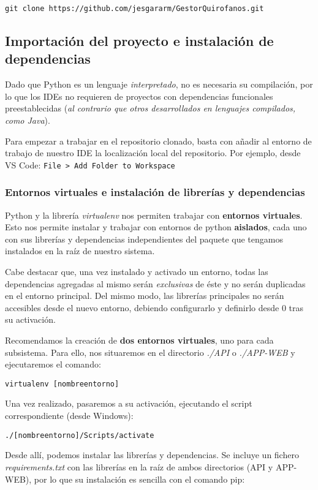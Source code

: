 \texttt{git clone https://github.com/jesgararm/GestorQuirofanos.git}

\subsection{Importación del proyecto e instalación de dependencias}

Dado que Python es un lenguaje \textit{interpretado}, no es necesaria su compilación, por lo que los IDEs no requieren de proyectos con dependencias funcionales preestablecidas (\textit{al contrario que otros desarrollados en lenguajes compilados, como Java}).

Para empezar a trabajar en el repositorio clonado, basta con añadir al entorno de trabajo de nuestro IDE la localización local del repositorio. Por ejemplo, desde VS Code:
\texttt{File > Add Folder to Workspace}


\subsubsection{Entornos virtuales e instalación de librerías y dependencias}

Python y la librería \textit{virtualenv} nos permiten trabajar con \textbf{entornos virtuales}. Esto nos permite instalar y trabajar con entornos de python \textbf{aislados}, cada uno con sus librerías y dependencias independientes del paquete que tengamos instalados en la raíz de nuestro sistema.

Cabe destacar que, una vez instalado y activado un entorno, todas las dependencias agregadas al mismo serán \textit{exclusivas} de éste y no serán duplicadas en el entorno principal. Del mismo modo, las librerías principales no serán accesibles desde el nuevo entorno, debiendo configurarlo y definirlo desde 0 tras su activación.

Recomendamos la creación de \textbf{dos entornos virtuales}, uno para cada subsistema. Para ello, nos situaremos en el directorio \textit{./API} o \textit{./APP-WEB} y ejecutaremos el comando:

\texttt{virtualenv [nombreentorno]}

Una vez realizado, pasaremos a su activación, ejecutando el script correspondiente (desde Windows):

\texttt{./[nombreentorno]/Scripts/activate}

Desde allí, podemos instalar las librerías y dependencias. Se incluye un fichero \textit{requirements.txt} con las librerías en la raíz de ambos directorios (API y APP-WEB), por lo que su instalación es sencilla con el comando pip:

